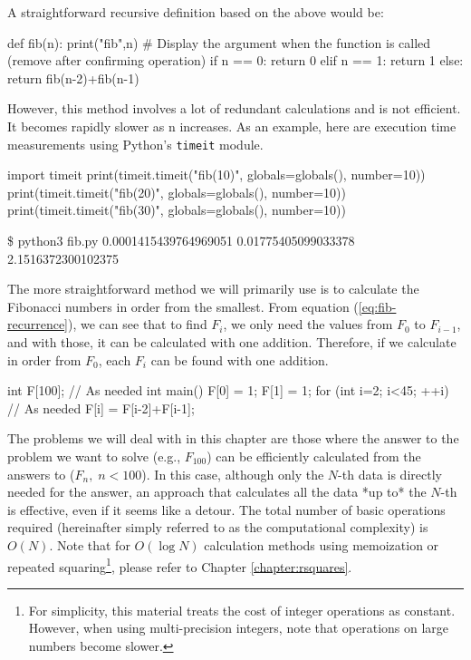A straightforward recursive definition based on the above would be:
\begin{pybox}
def fib(n):
    print("fib",n) # Display the argument when the function is called (remove after confirming operation)
    if n == 0:
        return 0
    elif n == 1:
        return 1
    else:
        return fib(n-2)+fib(n-1)
\end{pybox}

However, this method involves a lot of redundant calculations and is not efficient. It becomes rapidly slower as n increases.
As an example, here are execution time measurements using Python's \texttt{timeit} module.
\begin{pybox}[emph=timeit]
import timeit
print(timeit.timeit("fib(10)", globals=globals(), number=10))
print(timeit.timeit("fib(20)", globals=globals(), number=10))
print(timeit.timeit("fib(30)", globals=globals(), number=10))
\end{pybox}

\begin{terminal}
\$ python3 fib.py
0.0001415439764969051
0.01775405099033378
2.1516372300102375
\end{terminal}

The more straightforward method we will primarily use is to calculate the Fibonacci numbers in order from the smallest.
From equation (\ref{eq:fib-recurrence}), we can see that to find $F_i$, we only need the values from $F_0$ to $F_{i-1}$, and with those, it can be calculated with one addition. Therefore, if we calculate in order from $F_0$, each $F_i$ can be found with one addition.
\begin{cbox}
int F[100]; // As needed
int main() {
  F[0] = 1;
  F[1] = 1;
  for (int i=2; i<45; ++i) { // As needed
    F[i] = F[i-2]+F[i-1];
  }
}
\end{cbox}
The problems we will deal with in this chapter are those where the answer to the problem we want to solve (e.g., $F_{100}$) can be efficiently calculated from the answers to  ($F_{n}, \; n<100$).
In this case, although only the $N$-th data is directly needed for the answer, an approach that calculates all the data *up to* the $N$-th is effective, even if it seems like a detour.
The total number of basic operations required (hereinafter simply referred to as the computational complexity) is $O(N)$. Note that for $O(\log N)$ calculation methods using memoization or repeated squaring\footnote{For simplicity, this material treats the cost of integer operations as constant. However, when using multi-precision integers, note that operations on large numbers become slower.}, please refer to Chapter \ref{chapter:rsquares}.

